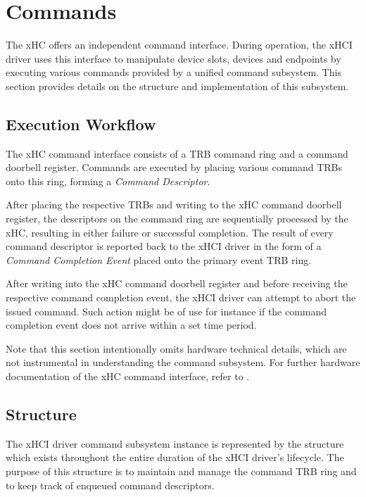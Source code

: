 \section{Commands}
\label{sec:commands}

The xHC offers an independent command interface. During operation, the xHCI
driver uses this interface to manipulate device slots, devices and endpoints by
executing various commands provided by a unified command subsystem. This
section provides details on the structure and implementation of this subsystem.


\subsection{Execution Workflow}

The xHC command interface consists of a TRB command ring and a command doorbell
register. Commands are executed by placing various command TRBs onto this ring,
forming a \textit{Command Descriptor}.

After placing the respective TRBs and writing to the xHC command doorbell
register, the descriptors on the command ring are sequentially processed by the
xHC, resulting in either failure or successful completion. The result of every
command descriptor is reported back to the xHCI driver in the form of a
\textit{Command Completion Event} placed onto the primary event TRB ring.

After writing into the xHC command doorbell register and before receiving the
respective command completion event, the xHCI driver can attempt to abort the
issued command. Such action might be of use for instance if the command
completion event does not arrive within a set time period.

Note that this section intentionally omits hardware technical details, which are
not instrumental in understanding the command subsystem. For further hardware
documentation of the xHC command interface, refer to .


\subsection{Structure}

The xHCI driver command subsystem instance is represented by the
 structure which exists throughout the entire duration
of the xHCI driver's lifecycle. The purpose of this structure is to maintain and
manage the command TRB ring and to keep track of enqueued command descriptors.

